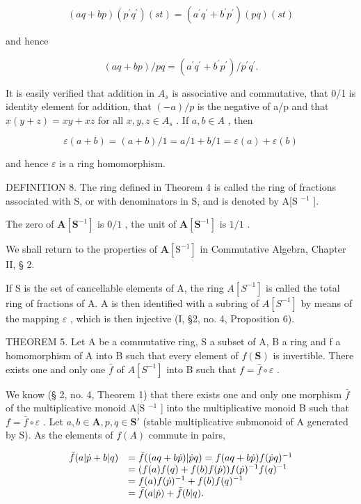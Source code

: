 \[
(a q + b p) \left(p ^ {\prime} q ^ {\prime}\right) (s t) = \left(a ^ {\prime} q ^ {\prime} + b ^ {\prime} p ^ {\prime}\right) (p q) (s t)
\]

and hence

\[
(a q + b p) / p q = (a ^ {\prime} q ^ {\prime} + b ^ {\prime} p ^ {\prime}) / p ^ {\prime} q ^ {\prime}.
\]

It is easily verified that addition in \(A_{s}\) is associative and commutative, that 0/1 is identity element for addition, that \((-a)/p\) is the negative of a/p and that \(x(y + z) = xy + xz\) for all \(x, y, z \in A_{s}\) . If \(a, b \in A\) , then

\[
\varepsilon (a + b) = (a + b) / 1 = a / 1 + b / 1 = \varepsilon (a) + \varepsilon (b)
\]

and hence \(\varepsilon\) is a ring homomorphism.

DEFINITION 8. The ring defined in Theorem 4 is called the ring of fractions associated with S, or with denominators in S, and is denoted by A{[}S \(^{-1}\) {]}.

The zero of \(\mathbf{A}[\mathbf{S}^{-1}]\) is \(0 / 1\) , the unit of \(\mathbf{A}[\mathbf{S}^{-1}]\) is \(1 / 1\) .

We shall return to the properties of \(\mathbf{A}[\mathrm{S}^{-1}]\) in Commutative Algebra, Chapter II, § 2.

If S is the set of cancellable elements of A, the ring \(A[S^{-1}]\) is called the total ring of fractions of A. A is then identified with a subring of \(A[S^{-1}]\) by means of the mapping \(\varepsilon\) , which is then injective (I, §2, no. 4, Proposition 6).

THEOREM 5. Let A be a commutative ring, S a subset of A, B a ring and f a homomorphism of A into B such that every element of \(f(\mathbf{S})\) is invertible. There exists one and only one \(\bar{f}\) of \(A[S^{-1}]\) into B such that \(f = \bar{f} \circ \varepsilon\) .

We know (§ 2, no. 4, Theorem 1) that there exists one and only one morphism \(\bar{f}\) of the multiplicative monoid A{[}S \(^{-1}\) {]} into the multiplicative monoid B such that \(f = \bar{f} \circ \varepsilon\) . Let \(a, b \in \mathbf{A}, p, q \in \mathbf{S}'\) (stable multiplicative submonoid of A generated by S). As the elements of \(f(A)\) commute in pairs,

\[
\begin{array}{r l} \bar {f} (a | \dot {p} + b | q) & = \bar {f} ((a q + b \dot {p}) | \dot {p} q) = f (a q + b \dot {p}) f (\dot {p} q) ^ {- 1} \\ & = (f (a) f (q) + f (b) f (\dot {p})) f (\dot {p}) ^ {- 1} f (q) ^ {- 1} \\ & = f (a) f (\dot {p}) ^ {- 1} + f (b) f (q) ^ {- 1} \\ & = \bar {f} (a | \dot {p}) + \bar {f} (b | q). \end{array}
\]

